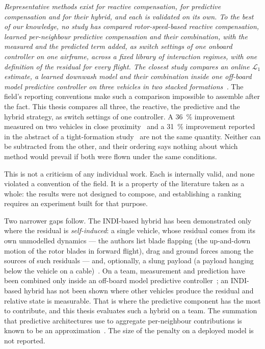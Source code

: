 \emph{Representative methods exist for reactive compensation, for predictive compensation and for
their hybrid, and each is validated on its own. To the best of our knowledge, no study has compared
rotor-speed-based reactive compensation, learned per-neighbour predictive compensation and their
combination, with the measured and the predicted term added, as switch settings of one onboard
controller on one airframe, across a fixed library of interaction regimes, with one definition of
the residual for every flight. The closest study compares an online $\mathcal{L}_1$ estimate, a
learned downwash model and their combination inside one off-board model predictive controller on
three vehicles in two stacked formations~\cite{hsieh2025onlineadaptation}.} The field's reporting
conventions make such a comparison impossible to assemble after the fact. This thesis compares all three, the
reactive, the predictive and the hybrid strategy, as switch settings of one controller. A
\SI{36}{\percent} improvement measured on two vehicles in close
proximity~\cite{smith2023so2equivariant} and a \SI{31}{\percent} improvement reported in the
abstract of a tight-formation study~\cite{hsieh2026flatness} are not the same quantity. Neither can
be subtracted from the other, and their ordering says nothing about which method would prevail if
both were flown under the same conditions.

This is not a criticism of any individual work. Each is internally valid, and none violated a
convention of the field. It is a property of the literature taken as a whole: the results were not
designed to compose, and establishing a ranking requires an experiment built for that purpose.

Two narrower gaps follow. The INDI-based hybrid has been demonstrated only where the residual is
\emph{self-induced}: a single vehicle, whose residual comes from its own unmodelled dynamics --- the
authors list blade flapping (the up-and-down motion of the rotor blades in forward flight), drag and
ground forces among the sources of such residuals --- and, optionally, a
slung payload (a payload hanging below the vehicle on a cable)~\cite{cobobriesewitz2026lindi}. On a
team, measurement and prediction have been combined only inside an off-board model predictive
controller~\cite{hsieh2025onlineadaptation}; an INDI-based hybrid has not been shown where other
vehicles produce the residual and relative state
is measurable. That is where the predictive component has the most to contribute, and this thesis
evaluates such a hybrid on a team. The summation
that predictive architectures use
to aggregate per-neighbour contributions is known to be an
approximation~\cite{shi2020neuralswarm,gielis2023aggregate}. The size of the penalty on a deployed
model is not reported.


